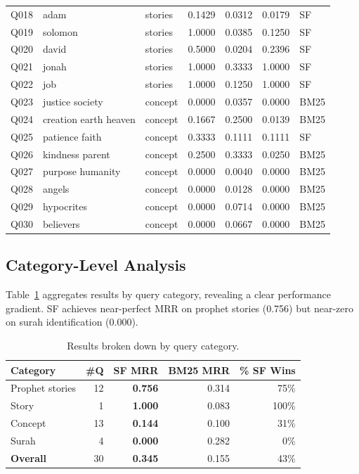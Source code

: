 \documentclass[conference]{IEEEtran}
\begin{document}
\begin{table}[t]
\begin{tabular}{cllrrrl}
    Q018 & adam & stories & 0.1429 & 0.0312 & 0.0179 & SF \\
    Q019 & solomon & stories & 1.0000 & 0.0385 & 0.1250 & SF \\
    Q020 & david & stories & 0.5000 & 0.0204 & 0.2396 & SF \\
    Q021 & jonah & stories & 1.0000 & 0.3333 & 1.0000 & SF \\
    Q022 & job & stories & 1.0000 & 0.1250 & 1.0000 & SF \\
    Q023 & justice society & concept & 0.0000 & 0.0357 & 0.0000 & BM25 \\
    Q024 & creation earth heaven & concept & 0.1667 & 0.2500 & 0.0139 & BM25 \\
    Q025 & patience faith & concept & 0.3333 & 0.1111 & 0.1111 & SF \\
    Q026 & kindness parent & concept & 0.2500 & 0.3333 & 0.0250 & BM25 \\
    Q027 & purpose humanity & concept & 0.0000 & 0.0040 & 0.0000 & BM25 \\
    Q028 & angels & concept & 0.0000 & 0.0128 & 0.0000 & BM25 \\
    Q029 & hypocrites & concept & 0.0000 & 0.0714 & 0.0000 & BM25 \\
    Q030 & believers & concept & 0.0000 & 0.0667 & 0.0000 & BM25 \\
    \bottomrule
  \end{tabular}
\end{table}

\subsection{Category-Level Analysis}

Table~\ref{tab:category} aggregates results by query category, revealing
a clear performance gradient. SF achieves near-perfect MRR on prophet
stories (0.756) but near-zero on surah identification (0.000).

\begin{table}[t]
  \centering
  \caption{Results broken down by query category.}
  \label{tab:category}
  \footnotesize
  \begin{tabular}{lrrrr}
    \toprule
    \textbf{Category} &
    \textbf{\#Q} &
    \textbf{\textcolor{sfblue}{SF MRR}} &
    \textbf{BM25 MRR} &
    \textbf{\% SF Wins} \\
    \midrule
    Prophet stories & 12 & \textbf{0.756} & 0.314 & 75\% \\
    Story & 1 & \textbf{1.000} & 0.083 & 100\% \\
    Concept & 13 & \textbf{0.144} & 0.100 & 31\% \\
    Surah & 4 & \textbf{0.000} & 0.282 & 0\% \\
    \midrule
    \textbf{Overall} & 30 & \textbf{0.345} & 0.155 & 43\% \\
    \bottomrule
  \end{tabular}
\end{table}
\end{document}
